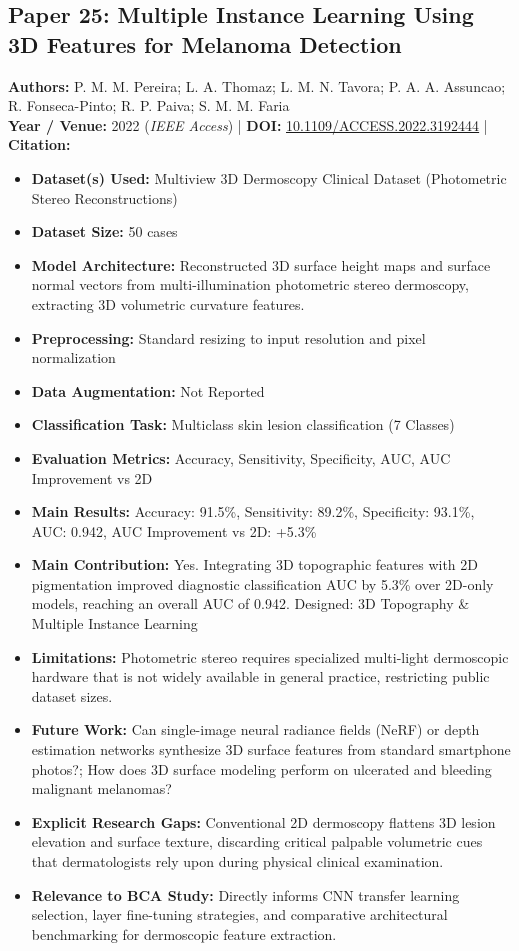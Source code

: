 \documentclass[11pt,a4paper]{article}
\begin{document}
\subsection{Paper 25: Multiple Instance Learning Using 3D Features for Melanoma Detection}
\textbf{Authors:} P. M. M. Pereira; L. A. Thomaz; L. M. N. Tavora; P. A. A. Assuncao; R. Fonseca-Pinto; R. P. Paiva; S. M. M. Faria \\
\textbf{Year / Venue:} 2022 (\textit{IEEE Access}) | \textbf{DOI:} \href{https://doi.org/10.1109/ACCESS.2022.3192444}{10.1109/ACCESS.2022.3192444} | \textbf{Citation:} \cite{9832874}

\begin{itemize}\small
\item \textbf{Dataset(s) Used:} Multiview 3D Dermoscopy Clinical Dataset (Photometric Stereo Reconstructions)
\item \textbf{Dataset Size:} 50 cases
\item \textbf{Model Architecture:} Reconstructed 3D surface height maps and surface normal vectors from multi-illumination photometric stereo dermoscopy, extracting 3D volumetric curvature features.
\item \textbf{Preprocessing:} Standard resizing to input resolution and pixel normalization
\item \textbf{Data Augmentation:} Not Reported
\item \textbf{Classification Task:} Multiclass skin lesion classification (7 Classes)
\item \textbf{Evaluation Metrics:} Accuracy, Sensitivity, Specificity, AUC, AUC Improvement vs 2D
\item \textbf{Main Results:} Accuracy: 91.5\%, Sensitivity: 89.2\%, Specificity: 93.1\%, AUC: 0.942, AUC Improvement vs 2D: +5.3\%
\item \textbf{Main Contribution:} Yes. Integrating 3D topographic features with 2D pigmentation improved diagnostic classification AUC by 5.3\% over 2D-only models, reaching an overall AUC of 0.942. Designed: 3D Topography \& Multiple Instance Learning
\item \textbf{Limitations:} Photometric stereo requires specialized multi-light dermoscopic hardware that is not widely available in general practice, restricting public dataset sizes.
\item \textbf{Future Work:} Can single-image neural radiance fields (NeRF) or depth estimation networks synthesize 3D surface features from standard smartphone photos?; How does 3D surface modeling perform on ulcerated and bleeding malignant melanomas?
\item \textbf{Explicit Research Gaps:} Conventional 2D dermoscopy flattens 3D lesion elevation and surface texture, discarding critical palpable volumetric cues that dermatologists rely upon during physical clinical examination.
\item \textbf{Relevance to BCA Study:} Directly informs CNN transfer learning selection, layer fine-tuning strategies, and comparative architectural benchmarking for dermoscopic feature extraction.
\end{itemize}
\end{document}
